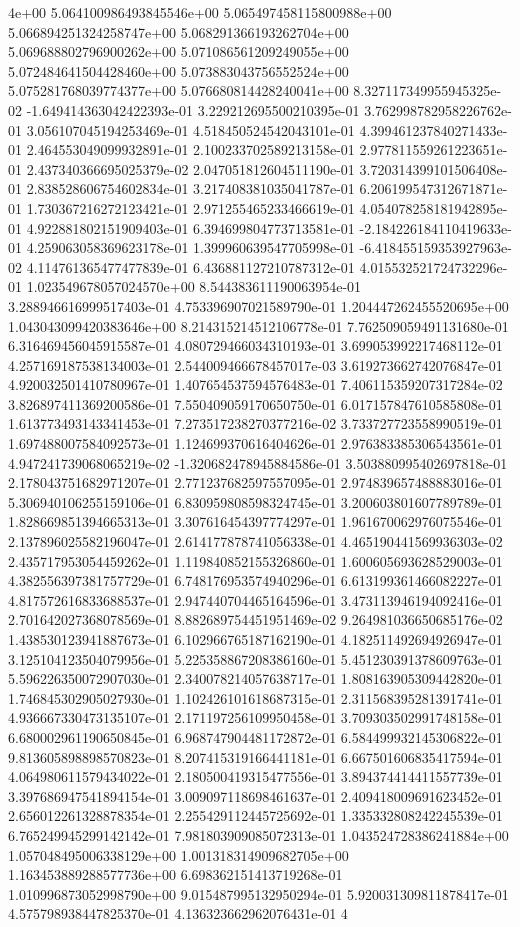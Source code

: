 4e+00	5.064100986493845546e+00	5.065497458115800988e+00	5.066894251324258747e+00	5.068291366193262704e+00	5.069688802796900262e+00	5.071086561209249055e+00	5.072484641504428460e+00	5.073883043756552524e+00	5.075281768039774377e+00	5.076680814428240041e+00
8.327117349955945325e-02	-1.649414363042422393e-01	3.229212695500210395e-01	3.762998782958226762e-01	3.056107045194253469e-01	4.518450524542043101e-01	4.399461237840271433e-01	2.464553049099932891e-01	2.100233702589213158e-01	2.977811559261223651e-01	2.437340366695025379e-02	2.047051812604511190e-01	3.720314399101506408e-01	2.838528606754602834e-01	3.217408381035041787e-01	6.206199547312671871e-01	1.730367216272123421e-01	2.971255465233466619e-01	4.054078258181942895e-01	4.922881802151909403e-01	6.394699804773713581e-01	-2.184226184110419633e-01	4.259063058369623178e-01	1.399960639547705998e-01	-6.418455159353927963e-02	4.114761365477477839e-01	6.436881127210787312e-01	4.015532521724732296e-01	1.023549678057024570e+00	8.544383611190063954e-01	3.288946616999517403e-01	4.753396907021589790e-01	1.204447262455520695e+00	1.043043099420383646e+00	8.214315214512106778e-01	7.762509059491131680e-01	6.316469456045915587e-01	4.080729466034310193e-01	3.699053992217468112e-01	4.257169187538134003e-01	2.544009466678457017e-03	3.619273662742076847e-01	4.920032501410780967e-01	1.407654537594576483e-01	7.406115359207317284e-02	3.826897411369200586e-01	7.550409059170650750e-01	6.017157847610585808e-01	1.613773493143341453e-01	7.273517238270377216e-02	3.733727723558990519e-01	1.697488007584092573e-01	1.124699370616404626e-01	2.976383385306543561e-01	4.947241739068065219e-02	-1.320682478945884586e-01	3.503880995402697818e-01	2.178043751682971207e-01	2.771237682597557095e-01	2.974839657488883016e-01	5.306940106255159106e-01	6.830959808598324745e-01	3.200603801607789789e-01	1.828669851394665313e-01	3.307616454397774297e-01	1.961670062976075546e-01	2.137896025582196047e-01	2.614177878741056338e-01	4.465190441569936303e-02	2.435717953054459262e-01	1.119840852155326860e-01	1.600605693628529003e-01	4.382556397381757729e-01	6.748176953574940296e-01	6.613199361466082227e-01	4.817572616833688537e-01	2.947440704465164596e-01	3.473113946194092416e-01	2.701642027368078569e-01	8.882689754451951469e-02	9.264981036650685176e-02	1.438530123941887673e-01	6.102966765187162190e-01	4.182511492694926947e-01	3.125104123504079956e-01	5.225358867208386160e-01	5.451230391378609763e-01	5.596226350072907030e-01	2.340078214057638717e-01	1.808163905309442820e-01	1.746845302905027930e-01	1.102426101618687315e-01	2.311568395281391741e-01	4.936667330473135107e-01	2.171197256109950458e-01	3.709303502991748158e-01	6.680002961190650845e-01	6.968747904481172872e-01	6.584499932145306822e-01	9.813605898898570823e-01	8.207415319166441181e-01	6.667501606835417594e-01	4.064980611579434022e-01	2.180500419315477556e-01	3.894374414411557739e-01	3.397686947541894154e-01	3.009097118698461637e-01	2.409418009691623452e-01	2.656012261328878354e-01	2.255429112445725692e-01	1.335332808242245539e-01	6.765249945299142142e-01	7.981803909085072313e-01	1.043524728386241884e+00	1.057048495006338129e+00	1.001318314909682705e+00	1.163453889288577736e+00	6.698362151413719268e-01	1.010996873052998790e+00	9.015487995132950294e-01	5.920031309811878417e-01	4.575798938447825370e-01	4.136323662962076431e-01	4